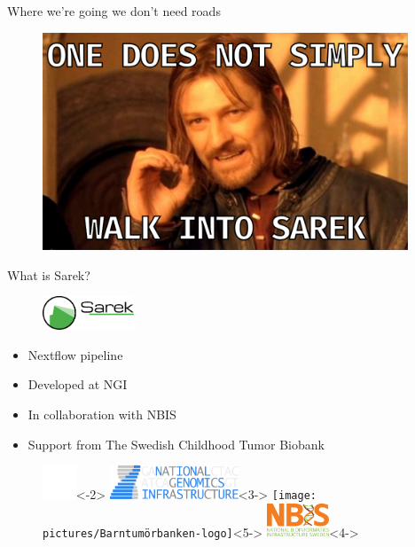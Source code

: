 \documentclass[usepdftitle=false]{beamer}
\begin{document}
\begin{frame}{Where we're going we don't need roads}
	\begin{figure}
		\includegraphics[height=6.5cm]{pictures/OneDoesNotSimply-meme.png}
	\end{figure}
\end{frame}

\begin{frame}{What is Sarek?}
	\begin{figure}
		\includegraphics[height=1cm]{pictures/Sarek_no_border}
	\end{figure}
	\begin{itemize}
		\pause
		\item Nextflow pipeline
		\item<3-> Developed at NGI
		\item<4-> In collaboration with NBIS
		\item<5-> Support from The Swedish Childhood Tumor Biobank
	\end{itemize}
	\begin{figure}
		\includegraphics[height=1cm]{pictures/blank}<-2>
		\includegraphics[height=1cm]{pictures/NGI}<3->
		\only<3->{\hfill}
		\texttt{[image: pictures/Barntumörbanken-logo]}<5->
		\only<4->{\hfill}
		\includegraphics[height=1cm]{pictures/NBIS}<4->
	\end{figure}
	\vfill
\end{frame}
\end{document}
